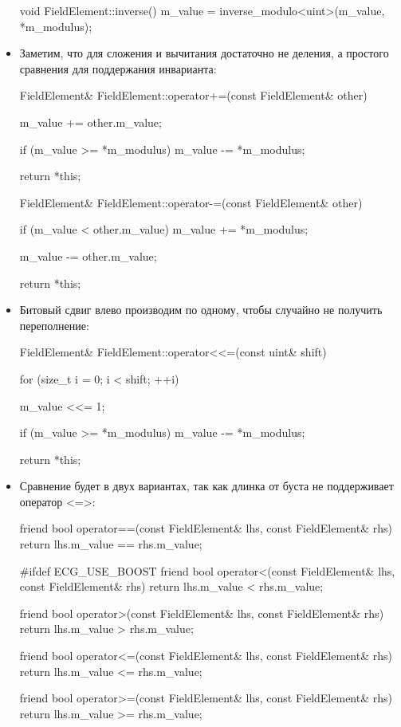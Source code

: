 \begin{itemize}
\begin{cppcode}
void FieldElement::inverse() {
    m_value = inverse_modulo<uint>(m_value, *m_modulus);
}
  \end{cppcode}
  
  \item Заметим, что для сложения и вычитания достаточно не деления, а простого сравнения для поддержания инварианта:
  \begin{cppcode}
FieldElement& FieldElement::operator+=(const FieldElement& other) {
    m_value += other.m_value;

    if (m_value >= *m_modulus) {
        m_value -= *m_modulus;
    }

    return *this;
}

FieldElement& FieldElement::operator-=(const FieldElement& other) {
    if (m_value < other.m_value) {
        m_value += *m_modulus;
    }

    m_value -= other.m_value;

    return *this;
}
  \end{cppcode}
  
  \item Битовый сдвиг влево производим по одному, чтобы случайно не получить переполнение:
  \begin{cppcode}
FieldElement& FieldElement::operator<<=(const uint& shift) {
    for (size_t i = 0; i < shift; ++i) {
        m_value <<= 1;

        if (m_value >= *m_modulus) {
            m_value -= *m_modulus;
        }
    }

    return *this;
}
  \end{cppcode}

  \item Сравнение будет в двух вариантах, так как длинка от буста не поддерживает оператор <=>:
  \begin{cppcode}
friend bool operator==(const FieldElement& lhs, const FieldElement& rhs) {
    return lhs.m_value == rhs.m_value;
}

#ifdef ECG_USE_BOOST
friend bool operator<(const FieldElement& lhs, const FieldElement& rhs) {
    return lhs.m_value < rhs.m_value;
}

friend bool operator>(const FieldElement& lhs, const FieldElement& rhs) {
    return lhs.m_value > rhs.m_value;
}

friend bool operator<=(const FieldElement& lhs, const FieldElement& rhs) {
    return lhs.m_value <= rhs.m_value;
}

friend bool operator>=(const FieldElement& lhs, const FieldElement& rhs) {
    return lhs.m_value >= rhs.m_value;
}


\end{cppcode}
\end{itemize}
